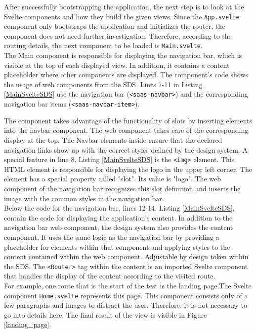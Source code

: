 After successfully bootstrapping the application, the next step is to look at the Svelte components and how they build the given views. Since the \texttt{App.svelte} component only bootstraps the application and initializes the router, the component does not need further investigation. Therefore, according to the routing details, the next component to be loaded is \texttt{Main.svelte}. \\
The Main component is responsible for displaying the navigation bar, which is visible at the top of each displayed view. In addition, it contains a content placeholder where other components are displayed.  The component's code shows the usage of web components from the  \ac{SDS}. Lines 7-11 in Listing \ref{MainSvelteSDS} use the navigation bar (\texttt{<saas-navbar>}) and the corresponding navigation bar items (\texttt{<saas-navbar-item>}).

The component takes advantage of the functionality of slots by inserting elements into the navbar component. The web component takes care of the corresponding display at the top. The Navbar elements inside ensure that the declared navigation links show up with the correct styles defined by the design system. A special feature in line 8, Listing \ref{MainSvelteSDS} is the \texttt{<img>} element. This \ac{HTML} element is responsible for displaying the logo in the upper left corner. The element has a special property called "slot". Its value is "logo". The web component of the navigation bar recognizes this slot definition and inserts the image with the common styles in the navigation bar. \\
Below the code for the navigation bar, lines 12-14, Listing \ref{MainSvelteSDS}, contain the code for displaying the application's content. In addition to the navigation bar web component, the design system also provides the content component. It uses the same logic as the navigation bar by providing a placeholder for elements within that component and applying styles to the content contained within the web component. Adjustable by design token within the SDS. The \texttt{<Router>} tag within the content is an imported Svelte component that handles the display of the content according to the visited route. \\
For example, one route that is the start of the test is the landing page.The Svelte component \texttt{Home.svelte} represents this page. This component consists only of a few paragraphs and images to distract the user. Therefore, it is not necessary to go into details here. The final result of the view is visible in Figure \ref{landing_page}.\\
